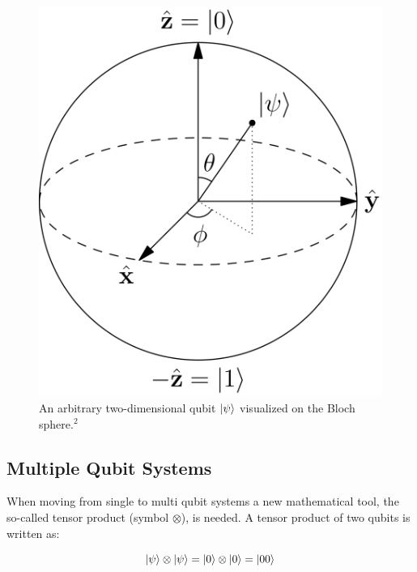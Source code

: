 \begin{figure}[!ht]
       \centering
       \includegraphics[scale=0.07]{img/blochsphere.png}
       \caption{\label{fig:blochsphere} An arbitrary two-dimensional qubit $\ket{\psi}$ visualized on the Bloch sphere.$^{2}$}
\end{figure}


\subsection{Multiple Qubit Systems}
\label{subsec:multiplequbitsystems}

When moving from single to multi qubit systems a new mathematical tool, the so-called tensor product (symbol $\otimes$), is needed. A tensor product of two qubits is written as:

\begin{equation}
\ket{\psi} \otimes \ket{\psi} = \ket{0} \otimes \ket{0} = \ket{00}
\end{equation}
 

